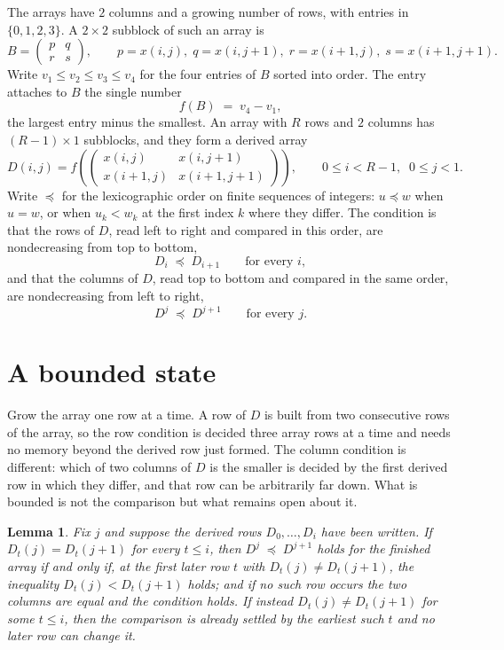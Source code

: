 \documentclass[11pt,a4paper]{article}
\theoremstyle{plain}
\newtheorem{lemma}[theorem]{Lemma}
\theoremstyle{definition}
\begin{document}
The arrays have $2$ columns and a growing number of rows, with entries in $\{0,1,2,3\}$. A
$2\times2$ subblock of such an array is
\[
B=\begin{pmatrix} p & q \\ r & s \end{pmatrix},
\qquad p=x(i,j),\; q=x(i,j+1),\; r=x(i+1,j),\; s=x(i+1,j+1).
\]
Write $v_1\le v_2\le v_3\le v_4$ for the four entries of $B$ sorted into order. The entry attaches to $B$ the single number
\[
f(B)\;=\;v_4-v_1,
\]
the largest entry minus the smallest. An array with $R$ rows and $2$ columns has $(R-1)\times1$ subblocks, and they
form a derived array
\[
D(i,j)=f\!\left(\begin{pmatrix} x(i,j) & x(i,j+1) \\ x(i+1,j) & x(i+1,j+1)\end{pmatrix}
\right),\qquad 0\le i<R-1,\;\; 0\le j<1 .
\]
Write $\preceq$ for the lexicographic order on finite sequences of integers: $u\preceq w$ when
$u=w$, or when $u_k<w_k$ at the first index $k$ where they differ. The condition is that the
rows of $D$, read left to right and compared in this order, are nondecreasing from top to bottom,
\[
D_{i}\;\preceq\;D_{i+1}\qquad\text{for every } i,
\]
and that the columns of $D$, read top to bottom and compared in the same order, are nondecreasing
from left to right,
\[
D^{j}\;\preceq\;D^{j+1}\qquad\text{for every } j .
\]

\section{A bounded state}

Grow the array one row at a time. A row of $D$ is built from two consecutive rows of the array,
so the row condition is decided three array rows at a time and needs no memory beyond the
derived row just formed. The column condition is different: which of two columns of $D$ is the
smaller is decided by the first derived row in which they differ, and that row can be
arbitrarily far down. What is bounded is not the comparison but what remains open about it.

\begin{lemma}\label{lem:bits}
Fix $j$ and suppose the derived rows $D_0,\dots,D_i$ have been written. If $D_t(j)=D_t(j+1)$ for
every $t\le i$, then $D^{j}\;\preceq\;D^{j+1}$ holds for the finished array if and only if,
at the first later row $t$ with $D_t(j)\neq D_t(j+1)$, the inequality $D_t(j)<D_t(j+1)$
holds; and if no such row occurs the two columns are equal and the condition holds. If instead
$D_t(j)\neq D_t(j+1)$ for some $t\le i$, then the comparison is already settled by the earliest
such $t$ and no later row can change it.
\end{lemma}
\end{document}
